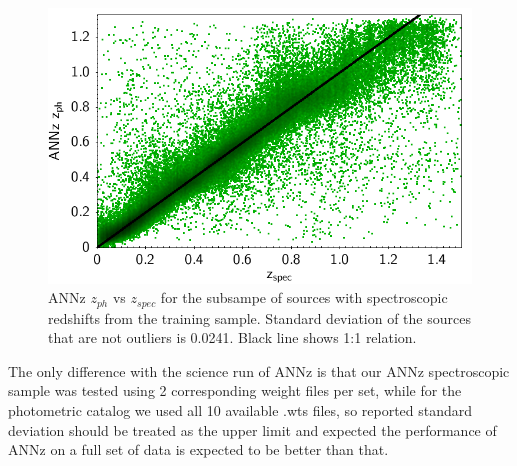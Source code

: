 \documentclass[apj,iop]{emulateapj}
\begin{document}
\begin{figure}
\begin{minipage}{\columnwidth}
\includegraphics[width=\columnwidth,height=0.28\textheight]{figures/annz_highz_photoz_specz_test1.png}
\caption{ANNz $z_{ph}$ vs $z_{spec}$ for the subsampe of sources with spectroscopic redshifts from the training sample. Standard deviation of the sources that are not outliers is 0.0241. Black line shows 1:1 relation.}
\label{fig:annz_highz}
\end{minipage}
\end{figure}

The only difference with the science run of ANNz is that our ANNz spectroscopic sample was tested using 2 corresponding weight files per set, while for the photometric catalog we used all 10 available .wts files, so reported standard deviation should be treated as the upper limit and expected the performance of ANNz on a full set of data is expected to be better than that.


\end{document}
